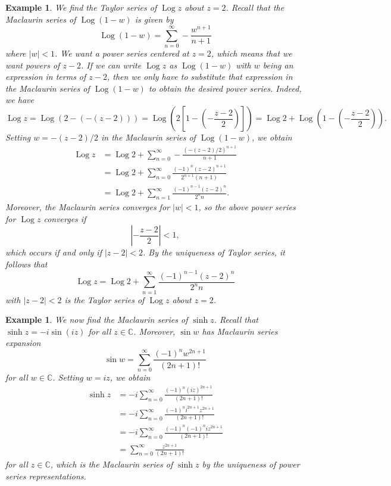 \documentclass[10pt]{article}
\newcommand{\C}{\mathbb{C}}
\DeclareMathOperator{\Log}{Log}
\theoremstyle{newstyle}
\newtheorem{exmp}[thm]{Example}
\begin{document}
\begin{exmp}
We find the Taylor series of $\Log z$ about $z = 2$. Recall that the Maclaurin series of 
$\Log(1-w)$ is given by 
\[ \Log(1-w) = \sum_{n=0}^\infty -\frac{w^{n+1}}{n+1} \]
where $|w| < 1$. We want a power series centered at $z = 2$, which means that we want powers of 
$z - 2$. If we can write $\Log z$ as $\Log(1-w)$ with $w$ being an expression in terms of 
$z - 2$, then we only have to substitute that expression in the Maclaurin series of 
$\Log(1-w)$ to obtain the desired power series. Indeed, we have 
\[ \Log z = \Log(2 - (-(z-2))) = \Log\left( 2 \left[ 1 - \left(- \frac{z-2}2 \right) \right] \right) 
= \Log 2 + \Log\left(1 - \left(- \frac{z-2}2 \right)\right). \]
Setting $w = -(z-2)/2$ in the Maclaurin series of $\Log(1-w)$, we obtain 
\begin{align*}
    \Log z &= \Log 2 + \sum_{n=0}^\infty - \frac{(-(z-2)/2)^{n+1}}{n+1} \\
    &= \Log 2 + \sum_{n=0}^\infty \frac{(-1)^n(z-2)^{n+1}}{2^{n+1}(n+1)} \\
    &= \Log 2 + \sum_{n=1}^\infty \frac{(-1)^{n-1}(z-2)^n}{2^nn}. 
\end{align*}
Moreover, the Maclaurin series converges for $|w| < 1$, so the above power series for $\Log z$ 
converges if 
\[ \left| - \frac{z-2}2 \right| < 1, \]
which occurs if and only if $|z-2| < 2$. By the uniqueness of Taylor series, it follows that 
\[ \Log z = \Log 2 + \sum_{n=1}^\infty \frac{(-1)^{n-1}(z-2)^n}{2^nn} \]
with $|z - 2| < 2$ is the Taylor series of $\Log z$ about $z = 2$. 
\end{exmp}

\begin{exmp}
We now find the Maclaurin series of $\sinh z$. Recall that $\sinh z = -i\sin(iz)$ for all $z \in \C$. 
Moreover, $\sin w$ has Maclaurin series expansion
\[ \sin w = \sum_{n=0}^\infty \frac{(-1)^n w^{2n+1}}{(2n+1)!} \]
for all $w \in \C$. Setting $w = iz$, we obtain 
\begin{align*}
    \sinh z 
    &= -i \sum_{n=0}^\infty \frac{(-1)^n(iz)^{2n+1}}{(2n+1)!} \\
    &= -i \sum_{n=0}^\infty \frac{(-1)^n i^{2n+1} z^{2n+1}}{(2n+1)!} \\
    &= -i \sum_{n=0}^\infty \frac{(-1)^n (-1)^n iz^{2n+1}}{(2n+1)!} \\
    &= \sum_{n=0}^\infty \frac{z^{2n+1}}{(2n+1)!}
\end{align*}
for all $z \in \C$, which is the Maclaurin series of $\sinh z$ by the uniqueness of power series 
representations. 
\end{exmp}
\end{document}
